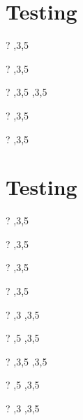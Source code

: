 \documentclass{article}
\begin{document}
\section{Testing \suffix}
\begin{zed} \vdash? \langle \rangle  \suffix   {},3,5 \rangle \end{zed}
\begin{zed} \vdash?  \rangle  \suffix   {},3,5 \rangle \end{zed}
\begin{zed} \vdash? ,3,5 \rangle  \suffix   {},3,5 \rangle \end{zed}
\begin{zed} \vdash? \lnot {} \rangle  \suffix   {},3,5 \rangle \end{zed}
\begin{zed} \vdash? \lnot {} \rangle  \suffix   {},3,5 \rangle \end{zed}

\section{Testing \infix}
\begin{zed} \vdash? \langle \rangle  \infix   {},3,5 \rangle \end{zed}
\begin{zed} \vdash?  \rangle  \infix   {},3,5 \rangle \end{zed}
\begin{zed} \vdash?  \rangle  \infix   {},3,5 \rangle \end{zed}
\begin{zed} \vdash?  \rangle  \infix   {},3,5 \rangle \end{zed}
\begin{zed} \vdash? ,3 \rangle  \infix   {},3,5 \rangle \end{zed}
\begin{zed} \vdash? ,5 \rangle  \infix   {},3,5 \rangle \end{zed}
\begin{zed} \vdash? ,3,5 \rangle  \infix   {},3,5 \rangle \end{zed}
\begin{zed} \vdash? \lnot {},5 \rangle  \infix   {},3,5 \rangle \end{zed}
\begin{zed} \vdash? \lnot {},3 \rangle  \infix   {},3,5 \rangle \end{zed}
\end{document}
